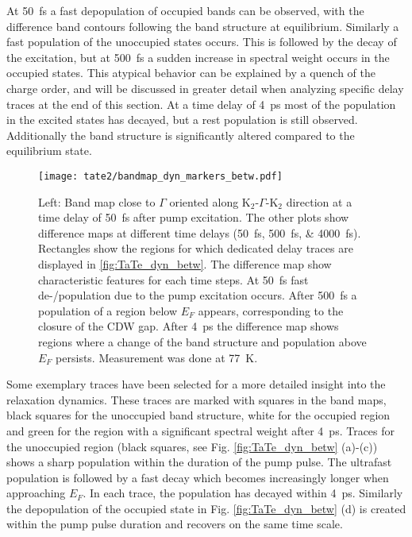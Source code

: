 At \qty{50}{\femto\second} a fast depopulation of occupied bands can be observed, with the difference band contours following the band structure at equilibrium.
Similarly a fast population of the unoccupied states occurs.
This is followed by the decay of the excitation, but at \qty{500}{\femto\second} a sudden increase in spectral weight occurs in the occupied states.
This atypical behavior can be explained by a quench of the charge order, and will be discussed in greater detail when analyzing specific delay traces at the end of this section.
At a time delay of \qty{4}{\pico\second} most of the population in the excited states has decayed, but a rest population is still observed.
Additionally the band structure is significantly altered compared to the equilibrium state.

\begin{figure}[t!]
	\centering
	\texttt{[image: tate2/bandmap\_dyn\_markers\_betw.pdf]}
	\caption{Left: Band map close to $\Gamma$ oriented along K$_2$-$\Gamma$-K$_2$ direction at a time delay of \qty{50}{\femto\second} after pump excitation. The other plots show difference maps at different time delays (\qtylist{50;500;4000}{\femto\second}). Rectangles show the regions for which dedicated delay traces are displayed in \ref{fig:TaTe_dyn_betw}. The difference map show characteristic features for each time steps. At \qty{50}{\femto\second} fast de-/population due to the pump excitation occurs. After \qty{500}{\femto\second} a population of a region below $E_F$ appears, corresponding to the closure of the CDW gap. After \qty{4}{\pico\second} the difference map shows regions where a change of the band structure and population above $E_F$ persists. Measurement was done at \qty{77}{\kelvin}.}
	\label{fig:TaTe_bandmap_dyn_betw}
\end{figure}

Some exemplary traces have been selected for a more detailed insight into the relaxation dynamics.
These traces are marked with squares in the band maps, black squares for the unoccupied band structure, white for the occupied region and green for the region with a significant spectral weight after \qty{4}{\pico\second}.
Traces for the unoccupied region (black squares, see Fig. \ref{fig:TaTe_dyn_betw} (a)-(c)) shows a sharp population within the duration of the pump pulse.
The ultrafast population is followed by a fast decay which becomes increasingly longer when approaching $E_F$.
In each trace, the population has decayed within \qty{4}{\pico\second}.
Similarly the depopulation of the occupied state in Fig. \ref{fig:TaTe_dyn_betw} (d) is created within the pump pulse duration and recovers on the same time scale.

